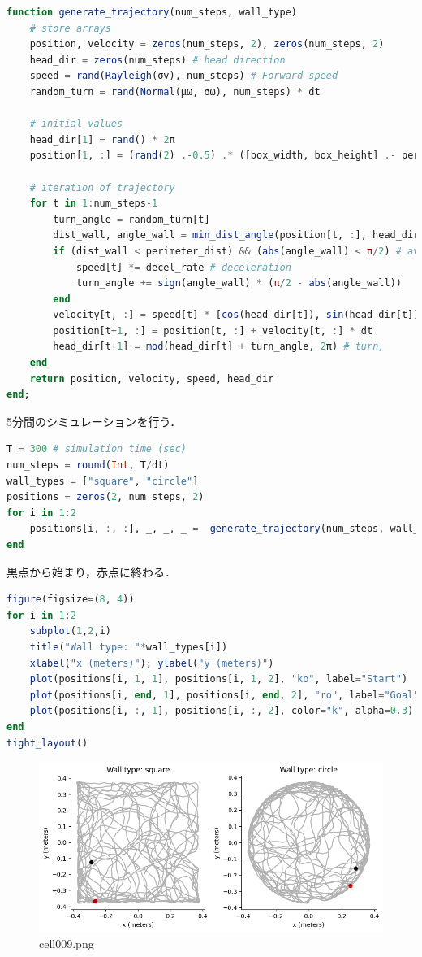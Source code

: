 \begin{lstlisting}[language=julia]
function generate_trajectory(num_steps, wall_type)
    # store arrays
    position, velocity = zeros(num_steps, 2), zeros(num_steps, 2)
    head_dir = zeros(num_steps) # head direction
    speed = rand(Rayleigh(σv), num_steps) # Forward speed
    random_turn = rand(Normal(μω, σω), num_steps) * dt

    # initial values
    head_dir[1] = rand() * 2π
    position[1, :] = (rand(2) .-0.5) .* ([box_width, box_height] .- perimeter_dist)
    
    # iteration of trajectory
    for t in 1:num_steps-1
        turn_angle = random_turn[t]
        dist_wall, angle_wall = min_dist_angle(position[t, :], head_dir[t], wall_type)
        if (dist_wall < perimeter_dist) && (abs(angle_wall) < π/2) # avoid wall
            speed[t] *= decel_rate # deceleration
            turn_angle += sign(angle_wall) * (π/2 - abs(angle_wall))
        end
        velocity[t, :] = speed[t] * [cos(head_dir[t]), sin(head_dir[t])]
        position[t+1, :] = position[t, :] + velocity[t, :] * dt
        head_dir[t+1] = mod(head_dir[t] + turn_angle, 2π) # turn, 
    end
    return position, velocity, speed, head_dir
end;
\end{lstlisting}
5分間のシミュレーションを行う．
\begin{lstlisting}[language=julia]
T = 300 # simulation time (sec)
num_steps = round(Int, T/dt)
wall_types = ["square", "circle"]
positions = zeros(2, num_steps, 2)
for i in 1:2
    positions[i, :, :], _, _, _ =  generate_trajectory(num_steps, wall_types[i]);
end
\end{lstlisting}
黒点から始まり，赤点に終わる．
\begin{lstlisting}[language=julia]
figure(figsize=(8, 4))
for i in 1:2
    subplot(1,2,i)
    title("Wall type: "*wall_types[i])
    xlabel("x (meters)"); ylabel("y (meters)")
    plot(positions[i, 1, 1], positions[i, 1, 2], "ko", label="Start")
    plot(positions[i, end, 1], positions[i, end, 2], "ro", label="Goal")
    plot(positions[i, :, 1], positions[i, :, 2], color="k", alpha=0.3)
end
tight_layout()
\end{lstlisting}
\begin{figure}[ht]
	\centering
	\includegraphics[scale=0.8, max width=\linewidth]{./fig/motor-learning/rat-trajectory/cell009.png}
	\caption{cell009.png}
	\label{cell009.png}
\end{figure}
